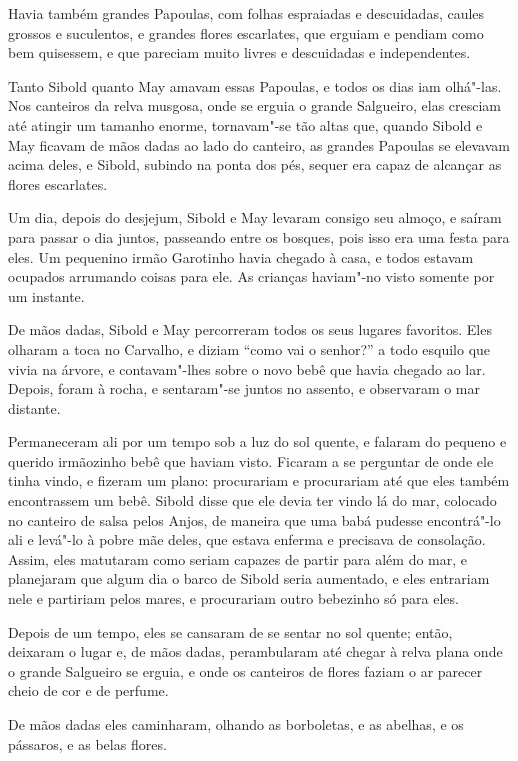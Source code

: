 Havia também grandes Papoulas, com folhas espraiadas e descuidadas,
caules grossos e suculentos, e grandes flores escarlates, que erguiam e
pendiam como bem quisessem, e que pareciam muito livres e descuidadas e
independentes.

Tanto Sibold quanto May amavam essas Papoulas, e todos os dias iam
olhá"-las. Nos canteiros da relva musgosa, onde se erguia o grande
Salgueiro, elas cresciam até atingir um tamanho enorme, tornavam"-se tão
altas que, quando Sibold e May ficavam de mãos dadas ao lado do
canteiro, as grandes Papoulas se elevavam acima deles, e Sibold, subindo
na ponta dos pés, sequer era capaz de alcançar as flores escarlates.

Um dia, depois do desjejum, Sibold e May levaram consigo seu almoço, e
saíram para passar o dia juntos, passeando entre os bosques, pois isso
era uma festa para eles. Um pequenino irmão Garotinho havia chegado à
casa, e todos estavam ocupados arrumando coisas para ele. As crianças
haviam"-no visto somente por um instante.

De mãos dadas, Sibold e May percorreram todos os seus lugares favoritos.
Eles olharam a toca no Carvalho, e diziam ``como vai o senhor?'' a todo
esquilo que vivia na árvore, e contavam"-lhes sobre o novo bebê que havia
chegado ao lar. Depois, foram à rocha, e sentaram"-se juntos no assento,
e observaram o mar distante.

Permaneceram ali por um tempo sob a luz do sol quente, e falaram do
pequeno e querido irmãozinho bebê que haviam visto. Ficaram a se
perguntar de onde ele tinha vindo, e fizeram um plano: procurariam e
procurariam até que eles também encontrassem um bebê. Sibold disse que
ele devia ter vindo lá do mar, colocado no canteiro de salsa pelos
Anjos, de maneira que uma babá pudesse encontrá"-lo ali e levá"-lo à pobre
mãe deles, que estava enferma e precisava de consolação. Assim, eles
matutaram como seriam capazes de partir para além do mar, e planejaram
que algum dia o barco de Sibold seria aumentado, e eles entrariam nele e
partiriam pelos mares, e procurariam outro bebezinho só para eles.

Depois de um tempo, eles se cansaram de se sentar no sol quente; então,
deixaram o lugar e, de mãos dadas, perambularam até chegar à relva plana
onde o grande Salgueiro se erguia, e onde os canteiros de flores faziam
o ar parecer cheio de cor e de perfume.

De mãos dadas eles caminharam, olhando as borboletas, e as abelhas, e os
pássaros, e as belas flores.

